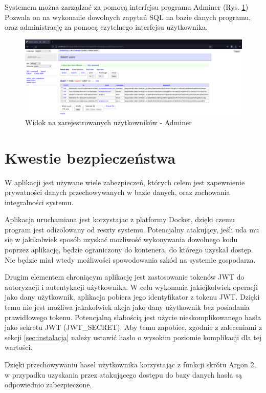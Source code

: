 \documentclass[a4paper,twoside,12pt]{book}
\begin{document}
Systemem można zarządzać za pomocą interfejsu programu Adminer (Rys. \ref{fig:adminer})
Pozwala on na wykonanie dowolnych zapytań SQL na bazie danych programu,
oraz administrację za pomocą czytelnego interfejsu użytkownika.

\begin{figure}[H]
\centering
\includegraphics[width=1.0\textwidth]{./images/adminer.png}
\caption{Widok na zarejestrowanych użytkowników - Adminer}
\label{fig:adminer}
\end{figure}

\section{Kwestie bezpieczeństwa}

W aplikacji jest używane wiele zabezpieczeń, których celem jest zapewnienie prywatności
danych przechowywanych w bazie danych, oraz zachowania integralności systemu.

Aplikacja uruchamiana jest korzystajac z platformy Docker, dzięki czemu program jest
odizolowany od reszty systemu. Potencjalny atakujący, jeśli uda mu się w jakikolwiek sposób
uzyskać możliwość wykonywania dowolnego kodu poprzez aplikację, będzie ograniczony do
kontenera, do którego uzyskał dostęp. Nie będzie miał wtedy możliwości spowodowania
szkód na systemie gospodarza.

Drugim elementem chroniącym aplikację jest zastosowanie tokenów JWT do autoryzacji i autentykacji
użytkownika. W celu wykonania jakiejkolwiek operacji jako dany użytkownik, aplikacja pobiera jego
identyfikator z tokenu JWT. Dzięki temu nie jest możliwa jakakolwiek akcja jako dany użytkownik
bez posiadania prawidłowego tokenu. Potencjalną słabością jest użycie nieskomplikowanego hasła 
jako sekretu JWT (JWT\_SECRET). Aby temu zapobiec, zgodnie z zaleceniami z 
sekcji \ref{sec:instalacja} należy ustawić hasło o wysokim poziomie komplikacji dla tej wartości.

Dzięki przechowywaniu haseł użytkownika korzystając z funkcji skrótu Argon 2, w przypadku uzyskania
przez atakującego dostępu do bazy danych hasła są odpowiednio zabezpieczone. 
\end{document}
